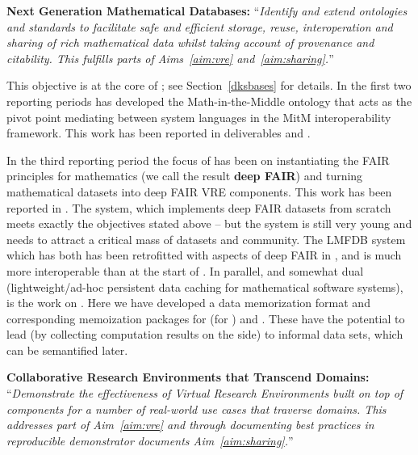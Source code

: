 \begin{compactenum}[\bf {Obj} 1\rm]
\endgroup

\item \label{objective:data}
  \textbf{Next Generation Mathematical Databases:}
  ``\emph{Identify and extend ontologies and
  standards to facilitate safe and efficient storage, reuse,
  interoperation and sharing of rich mathematical data whilst taking
  account of provenance and citability. This fulfills parts of
  Aims~\ref{aim:vre} and~\ref{aim:sharing}.}''

  This objective is at the core of ; see Section~\ref{dksbases} for details.
  In the first two reporting periods  has developed the Math-in-the-Middle ontology that acts as the pivot point mediating between system languages in the MitM interoperability framework.
  This work has been reported in deliverables  and .

  In the third reporting period the focus of  has been on instantiating the FAIR principles for mathematics (we call the result \textbf{deep FAIR}) and turning mathematical datasets into deep FAIR VRE components.
  This work has been reported in .
  The \dmh system, which implements deep FAIR datasets from scratch meets exactly the objectives stated above -- but the system is still very young and needs to attract a critical mass of datasets and community.
  The LMFDB system which has both has been retrofitted with aspects of deep FAIR in \pn, and is much more interoperable than at the start of \pn.
  In parallel, and somewhat dual (lightweight/ad-hoc persistent data caching for mathematical software systems), is the work on . Here we have developed a  data memorization format and corresponding memoization packages for \Python (for \Sage) and \GAP.
  These have the potential to lead (by collecting computation results on the side) to informal data sets, which can be semantified later.

\item \label{objective:demo}
  \textbf{Collaborative Research Environments that Transcend Domains:}
  ``\emph{Demonstrate the effectiveness of Virtual
    Research Environments built on top of \ODK components for a
    number of real-world use cases that traverse domains. This addresses
    part of Aim~\ref{aim:vre} and through documenting best practices in
    reproducible demonstrator documents Aim~\ref{aim:sharing}.}''


\end{compactenum}

